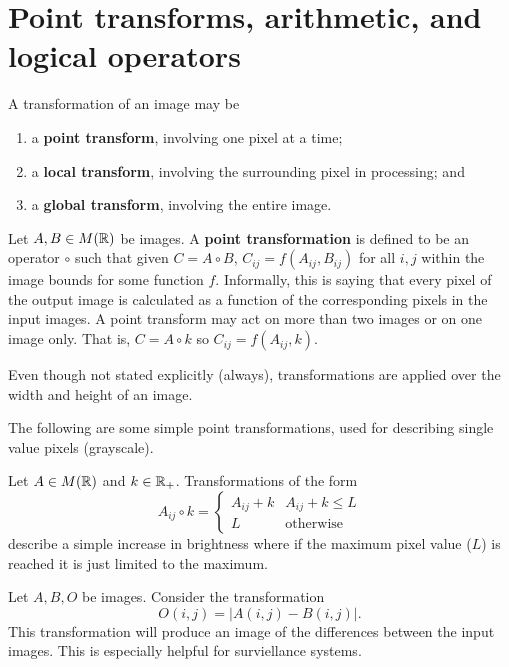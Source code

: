 \chapter{Point transforms, arithmetic, and logical operators}

A transformation of an image may be 
\begin{enumerate}
    \item a \textbf{point transform}, involving one pixel at a time;
    \item a \textbf{local transform}, involving the surrounding pixel in processing; and
    \item a \textbf{global transform}, involving the entire image.
\end{enumerate}

\begin{definition}
    Let $A, B \in M(\mathbb{R})$ be images. A \textbf{point transformation} is defined to be an operator $\circ$ such that given $C = A \circ B$, $C_{ij} = f(A_{ij}, B_{ij})$ for all $i, j$ within the image bounds for some function $f$. Informally, this is saying that every pixel of the output image is calculated as a function of the corresponding pixels in the input images. A point transform may act on more than two images or on one image only. That is, $C = A \circ k$ so $C_{ij} = f(A_{ij}, k)$.
\end{definition}

\begin{remark}
    Even though not stated explicitly (always), transformations are applied over the width and height of an image.
\end{remark}

The following are some simple point transformations, used for describing single value pixels (grayscale).

\begin{example}[Brightness]
    Let $A \in M(\mathbb{R})$ and $k \in \mathbb{R}_+$. Transformations of the form
    \[ A_{ij} \circ k = \begin{cases} A_{ij} + k & A_{ij} + k \leq L \\ L & \text{otherwise} \end{cases} \]
    describe a simple increase in brightness where if the maximum pixel value ($L$) is reached it is just limited to the maximum.
\end{example}

\begin{example}
    Let $A, B, O$ be images. Consider the transformation
    \[ O(i, j) = \lvert A(i, j) - B(i, j) \rvert. \]
    This transformation will produce an image of the differences between the input images. This is especially helpful for surviellance systems.
\end{example}

